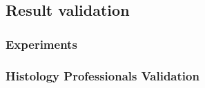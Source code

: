 \documentclass[../main.tex]{subfiles}
\begin{document}
\subsection{Result validation}
\label{result-validation}
\lipsum[1]

\subsubsection{Experiments}
\lipsum[2]

\subsubsection{Histology Professionals Validation}
\lipsum[3]

\printbibliography
\end{document}
